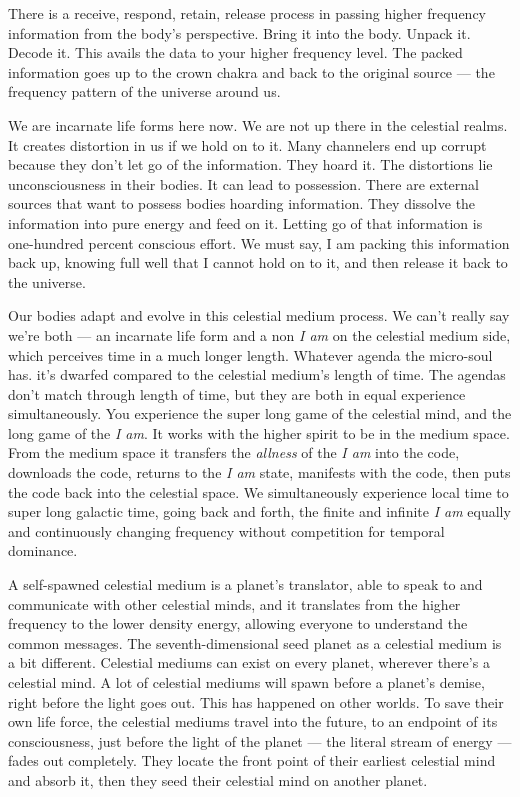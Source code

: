 \documentclass[letterpaper,9pt,twoside,titlepage,onecolumn,openany]{book}
\begin{document}
There is a receive, respond, retain, release process in passing higher
frequency information from the body's perspective. Bring it into the
body. Unpack it. Decode it. This avails the data to your higher
frequency level. The packed information goes up to the crown chakra and
back to the original source --- the frequency pattern of the universe
around us.

We are incarnate life forms here now. We are not up there in the
celestial realms. It creates distortion in us if we hold on to it. Many
channelers end up corrupt because they don't let go of the information.
They hoard it. The distortions lie unconsciousness in their bodies. It
can lead to possession. There are external sources that want to possess
bodies hoarding information. They dissolve the information into pure
energy and feed on it. Letting go of that information is one-hundred
percent conscious effort. We must say, I am packing this information
back up, knowing full well that I cannot hold on to it, and then release
it back to the universe.

Our bodies adapt and evolve in this celestial medium process. We can't
really say we're both --- an incarnate life form and a non \emph{I am}
on the celestial medium side, which perceives time in a much longer
length. Whatever agenda the micro-soul has. it's dwarfed compared to the
celestial medium's length of time. The agendas don't match through
length of time, but they are both in equal experience simultaneously.
You experience the super long game of the celestial mind, and the long
game of the \emph{I am}. It works with the higher spirit to be in the
medium space. From the medium space it transfers the \emph{allness} of
the \emph{I am} into the code, downloads the code, returns to the
\emph{I am} state, manifests with the code, then puts the code back into
the celestial space. We simultaneously experience local time to super
long galactic time, going back and forth, the finite and infinite
\emph{I am} equally and continuously changing frequency without
competition for temporal dominance.

A self-spawned celestial medium is a planet's translator, able to speak
to and communicate with other celestial minds, and it translates from
the higher frequency to the lower density energy, allowing everyone to
understand the common messages. The seventh-dimensional seed planet as a
celestial medium is a bit different. Celestial mediums can exist on
every planet, wherever there's a celestial mind. A lot of celestial
mediums will spawn before a planet's demise, right before the light goes
out. This has happened on other worlds. To save their own life force,
the celestial mediums travel into the future, to an endpoint of its
consciousness, just before the light of the planet --- the literal
stream of energy --- fades out completely. They locate the front point
of their earliest celestial mind and absorb it, then they seed their
celestial mind on another planet.
\end{document}
